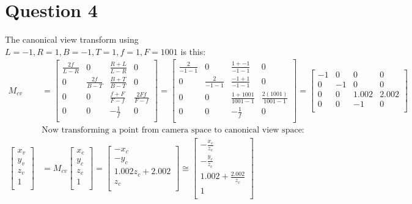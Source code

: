 \documentclass{article} %
\begin{document}
\newpage
\section{Question 4}
The canonical view transform using $L=-1, R = 1, B = -1, T = 1, f = 1, F=1001$ is this:
\begin{align*}
M_{cv} &=
\begin{bmatrix}
\frac{2f}{L-R} & 0 & \frac{R + L}{L - R} & 0\\
0 & \frac{2f}{B-T} & \frac{B + T}{B - T} & 0\\
0 & 0 & \frac{f + F}{F - f} & \frac{2Ff}{F - f}\\
0 & 0 & -\frac{1}{f} & 0\\
\end{bmatrix}
= \begin{bmatrix}
\frac{2}{-1-1} & 0 & \frac{1 + -1}{-1 - 1} & 0\\
0 & \frac{2}{-1-1} & \frac{-1 + 1}{-1 - 1} & 0\\
0 & 0 & \frac{1 + 1001}{1001 - 1} & \frac{2(1001)}{1001 - 1}\\
0 & 0 & -\frac{1}{f} & 0\\
\end{bmatrix}
=
\begin{bmatrix}
-1 & 0 & 0 & 0\\
0 & -1 & 0 & 0\\
0 & 0 & 1.002 & 2.002\\
0 & 0 & -1 & 0\\
\end{bmatrix}\\
&\text{Now transforming a point from camera space to canonical view space:}\\
\begin{bmatrix}
x_v\\
y_v\\
z_v\\
1\\
\end{bmatrix}
&= M_{cv} \begin{bmatrix}
x_c\\
y_c\\
z_c\\
1\\
\end{bmatrix}
= \begin{bmatrix}
-x_c\\
-y_c\\
1.002 z_c + 2.002\\
z_c\\
\end{bmatrix}
\cong
\begin{bmatrix}
-\frac{x_c}{z_c}\\
-\frac{y_c}{z_c}\\
1.002 + \frac{2.002}{z_c}\\
1\\
\end{bmatrix}
\end{align*}
\end{document}
